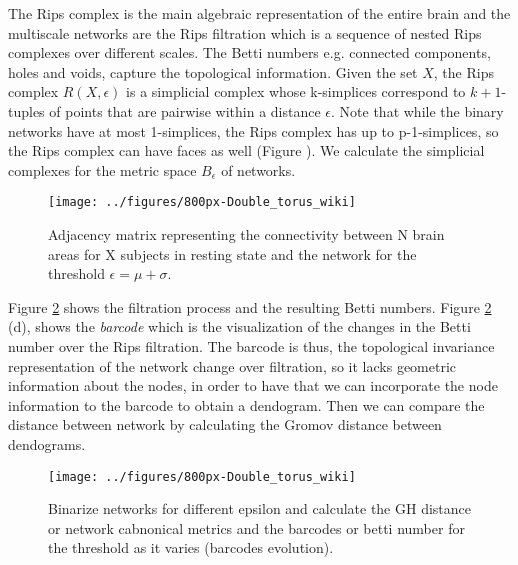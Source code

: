 \documentclass[onecollarge,runningheads]{svjour2}
\begin{document}
The Rips complex is the main algebraic representation of the entire brain and the multiscale networks are the Rips filtration which is a sequence of nested Rips complexes over different scales. The Betti numbers e.g. connected components, holes and voids, capture the topological information.
Given the set $X$, the Rips complex $R(X,\epsilon)$ is a simplicial complex whose k-simplices correspond to $k+1$-tuples of points that are pairwise within a distance $\epsilon$.
Note that while the binary networks have at most 1-simplices, the Rips complex has up to p-1-simplices, so the Rips complex can have faces as well (Figure \cite{ex:dyadic}). 
We calculate the simplicial complexes for the metric space $B_\epsilon$ of networks. 

\begin{figure}[h]
        \centering
        \texttt{[image: ../figures/800px-Double\_torus\_wiki]}
        \caption{Adjacency matrix representing the connectivity between N brain areas for X subjects in resting state and the network for the threshold $\epsilon = \mu + \sigma$.
}
\label{fig:adjmatrix}
\end{figure}


Figure \ref{fig:ph1} shows the filtration process and the resulting Betti numbers. Figure \ref{fig:ph1} (d), shows the \textit{barcode} which is the visualization of the changes in the Betti number over the Rips filtration. The barcode is thus, the topological invariance representation of the network change over filtration, so it lacks geometric information about the nodes, in order to have that we can incorporate the node information to the barcode to obtain a dendogram. Then we can compare the distance between network by calculating the Gromov distance between dendograms.
\begin{figure}[h]
        \centering
        \texttt{[image: ../figures/800px-Double\_torus\_wiki]}
        \caption{Binarize networks for different epsilon and calculate the GH distance or network cabnonical metrics and the barcodes or betti number for the threshold as it varies (barcodes evolution).
}
\label{fig:ph1}
\end{figure}
\end{document}
